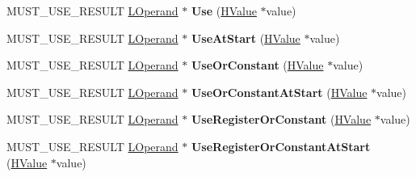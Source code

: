 \begin{DoxyCompactItemize}
\item 
M\+U\+S\+T\+\_\+\+U\+S\+E\+\_\+\+R\+E\+S\+U\+LT \hyperlink{classv8_1_1internal_1_1_l_operand}{L\+Operand} $\ast$ {\bfseries Use} (\hyperlink{classv8_1_1internal_1_1_h_value}{H\+Value} $\ast$value)\hypertarget{classv8_1_1internal_1_1_l_chunk_builder_ac07caab581a6124e19461a131e9be312}{}\label{classv8_1_1internal_1_1_l_chunk_builder_ac07caab581a6124e19461a131e9be312}

\item 
M\+U\+S\+T\+\_\+\+U\+S\+E\+\_\+\+R\+E\+S\+U\+LT \hyperlink{classv8_1_1internal_1_1_l_operand}{L\+Operand} $\ast$ {\bfseries Use\+At\+Start} (\hyperlink{classv8_1_1internal_1_1_h_value}{H\+Value} $\ast$value)\hypertarget{classv8_1_1internal_1_1_l_chunk_builder_a0b5ba53107d18a45201bd6c3812ee7ab}{}\label{classv8_1_1internal_1_1_l_chunk_builder_a0b5ba53107d18a45201bd6c3812ee7ab}

\item 
M\+U\+S\+T\+\_\+\+U\+S\+E\+\_\+\+R\+E\+S\+U\+LT \hyperlink{classv8_1_1internal_1_1_l_operand}{L\+Operand} $\ast$ {\bfseries Use\+Or\+Constant} (\hyperlink{classv8_1_1internal_1_1_h_value}{H\+Value} $\ast$value)\hypertarget{classv8_1_1internal_1_1_l_chunk_builder_a5607415776a13456e36fa5ba92b8dcdd}{}\label{classv8_1_1internal_1_1_l_chunk_builder_a5607415776a13456e36fa5ba92b8dcdd}

\item 
M\+U\+S\+T\+\_\+\+U\+S\+E\+\_\+\+R\+E\+S\+U\+LT \hyperlink{classv8_1_1internal_1_1_l_operand}{L\+Operand} $\ast$ {\bfseries Use\+Or\+Constant\+At\+Start} (\hyperlink{classv8_1_1internal_1_1_h_value}{H\+Value} $\ast$value)\hypertarget{classv8_1_1internal_1_1_l_chunk_builder_a5338ef34c47b58207b22fd5a66807f85}{}\label{classv8_1_1internal_1_1_l_chunk_builder_a5338ef34c47b58207b22fd5a66807f85}

\item 
M\+U\+S\+T\+\_\+\+U\+S\+E\+\_\+\+R\+E\+S\+U\+LT \hyperlink{classv8_1_1internal_1_1_l_operand}{L\+Operand} $\ast$ {\bfseries Use\+Register\+Or\+Constant} (\hyperlink{classv8_1_1internal_1_1_h_value}{H\+Value} $\ast$value)\hypertarget{classv8_1_1internal_1_1_l_chunk_builder_aace121601a2caa8e6684cc5d5963f0df}{}\label{classv8_1_1internal_1_1_l_chunk_builder_aace121601a2caa8e6684cc5d5963f0df}

\item 
M\+U\+S\+T\+\_\+\+U\+S\+E\+\_\+\+R\+E\+S\+U\+LT \hyperlink{classv8_1_1internal_1_1_l_operand}{L\+Operand} $\ast$ {\bfseries Use\+Register\+Or\+Constant\+At\+Start} (\hyperlink{classv8_1_1internal_1_1_h_value}{H\+Value} $\ast$value)\hypertarget{classv8_1_1internal_1_1_l_chunk_builder_a14ca10ac408e3ec8501d2875ddf606fc}{}\label{classv8_1_1internal_1_1_l_chunk_builder_a14ca10ac408e3ec8501d2875ddf606fc}


\end{DoxyCompactItemize}

